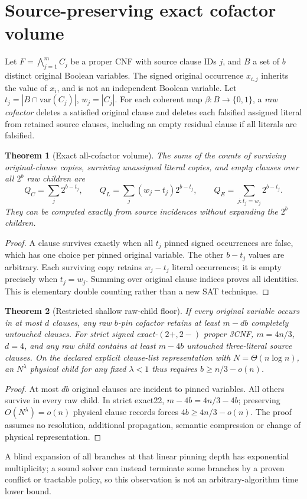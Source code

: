 \documentclass[11pt]{article}
\newtheorem{theorem}{Theorem}
\begin{document}
\section{Source-preserving exact cofactor volume}
Let $F=\bigwedge_{j=1}^mC_j$ be a proper CNF with source clause IDs $j$,
and $B$ a set of $b$ distinct original Boolean variables. The signed
original occurrence $x_{i,j}$ inherits the value of $x_i$, and is not an
independent Boolean variable. Let $t_j=|B\cap\mathrm{var}(C_j)|$,
$w_j=|C_j|$. For each coherent map $\beta:B\to\{0,1\}$, a
\emph{raw cofactor} deletes a satisfied original clause and deletes
each falsified assigned literal from retained source clauses, including
an empty residual clause if all literals are falsified.
\begin{theorem}[Exact all-cofactor volume]
The sums of the counts of surviving original-clause copies, surviving
unassigned literal copies, and empty clauses over all $2^b$ raw children are
\[
  Q_C=\sum_j2^{b-t_j},\qquad
  Q_L=\sum_j(w_j-t_j)2^{b-t_j},\qquad
  Q_E=\sum_{j:t_j=w_j}2^{b-t_j}.
\]
They can be computed exactly from source incidences without expanding
the $2^b$ children.
\end{theorem}
\begin{proof}
A clause survives exactly when all $t_j$ pinned signed occurrences
are false, which has one choice per pinned original variable.
The other $b-t_j$ values are arbitrary. Each surviving copy retains
$w_j-t_j$ literal occurrences; it is empty precisely when $t_j=w_j$.
Summing over original clause indices proves all identities.
This is elementary double counting rather than a new SAT technique.
\end{proof}
\begin{theorem}[Restricted shallow raw-child floor]
If every original variable occurs in at most $d$ clauses, any raw
$b$-pin cofactor retains at least $m-db$ completely untouched clauses.
For strict signed exact-$(2+,2-)$ proper 3CNF,
$m=4n/3$, $d=4$, and any raw child contains at least $m-4b$
untouched three-literal source clauses.
On the declared explicit clause-list representation with
$N=\Theta(n\log n)$, an $N^\lambda$ physical child for any fixed
$\lambda<1$ thus requires $b\ge n/3-o(n)$.
\end{theorem}
\begin{proof}
At most $db$ original clauses are incident to pinned variables.
All others survive in every raw child. In strict exact22,
$m-4b=4n/3-4b$; preserving $O(N^\lambda)=o(n)$ physical
clause records forces $4b\ge4n/3-o(n)$.
The proof assumes no resolution, additional propagation,
semantic compression or change of physical representation.
\end{proof}
A blind expansion of all branches at that linear pinning depth
has exponential multiplicity; a sound solver can instead terminate
some branches by a proven conflict or tractable policy, so this
observation is not an arbitrary-algorithm time lower bound.
\end{document}
